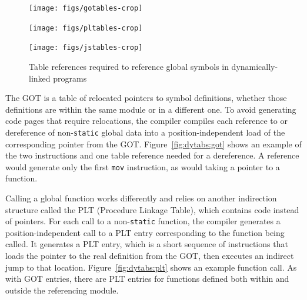 \begin{figure}
	\begin{minipage}{\textwidth}
	\texttt{[image: figs/gotables-crop]}
	\label{fig:dytabs:got}
	\end{minipage}

	\begin{minipage}{\textwidth}
	\texttt{[image: figs/pltables-crop]}
	\label{fig:dytabs:plt}
	\end{minipage}

	\begin{minipage}{\textwidth}
	\texttt{[image: figs/jstables-crop]}
	\label{fig:dytabs:lazy}
	\end{minipage}
\caption[Table references required to reference global symbols]{
Table references required to reference global symbols in dynamically-linked
programs}
\label{fig:dytabs}
\end{figure}

The GOT is a table of relocated pointers to symbol definitions, whether those
definitions are within the same module or in a different one.  To avoid generating
code pages that require relocations, the compiler compiles each reference to or
dereference of non-\texttt{static} global data into a position-independent load of
the corresponding pointer from the GOT.  Figure~\ref{fig:dytabs:got} shows an example
of the two instructions and one table reference needed for a dereference.  A
reference would generate only the first \texttt{mov} instruction, as would taking a
pointer to a function.

Calling a global function works differently and relies on another indirection
structure called the PLT (Procedure Linkage Table), which contains code instead of
pointers.  For each call to a non-\texttt{static} function, the compiler generates a
position-independent call to a PLT entry corresponding to the function being called.
It generates a PLT entry, which is a short sequence of instructions that loads the
pointer to the real definition from the GOT, then executes an indirect jump to that
location.  Figure~\ref{fig:dytabs:plt} shows an example function call.  As with GOT
entries, there are PLT entries for functions defined both within and outside the
referencing module.

